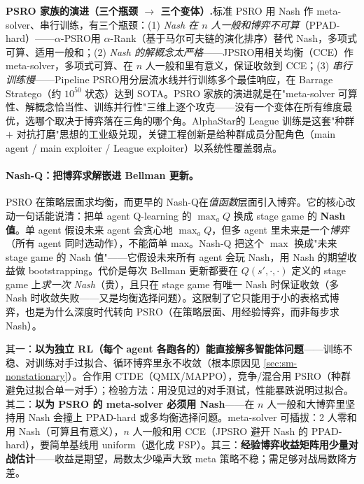 \begin{note}
\textbf{PSRO 家族的演进（三个瓶颈 $\to$ 三个变体）.}\;标准 PSRO 用 Nash 作 meta-solver、串行训练，有三个瓶颈：(1) \emph{Nash 在 $n$ 人一般和博弈不可算}（PPAD-hard）——$\alpha$-PSRO\cite{muller2020alpharank}用 $\alpha$-Rank（基于马尔可夫链的演化排序）替代 Nash，多项式可算、适用一般和；(2) \emph{Nash 的解概念太严格}——JPSRO\cite{marris2021jpsro}用相关均衡（CCE）作 meta-solver，多项式可算、在 $n$ 人一般和里有意义，保证收敛到 CCE；(3) \emph{串行训练慢}——Pipeline PSRO\cite{mcaleer2020pipeline}用分层流水线并行训练多个最佳响应，在 Barrage Stratego（约 $10^{50}$ 状态）达到 SOTA。PSRO 家族的演进就是在"meta-solver 可算性、解概念恰当性、训练并行性"三维上逐个攻克——没有一个变体在所有维度最优，选哪个取决于博弈落在三角的哪个角。AlphaStar\cite{vinyals2019alphastar}的 League 训练是这套"种群 $+$ 对抗打磨"思想的工业级兑现，关键工程创新是给种群成员分配角色（main agent / main exploiter / League exploiter）以系统性覆盖弱点。
\end{note}

\paragraph{Nash-Q：把博弈求解嵌进 Bellman 更新。}
PSRO 在策略层面求均衡，而更早的 Nash-Q\cite{hu2003nashq}在\emph{值函数}层面引入博弈。它的核心改动一句话能说清：把单 agent Q-learning 的 $\max_a Q$ 换成 stage game 的 \textbf{Nash 值}。单 agent 假设未来 agent 会贪心地 $\max_a Q$，但多 agent 里未来是一个\emph{博弈}（所有 agent 同时选动作），不能简单 max。Nash-Q 把这个 $\max$ 换成"未来 stage game 的 Nash 值"——它假设未来所有 agent 会玩 Nash，用 Nash 的期望收益做 bootstrapping。代价是每次 Bellman 更新都要在 $Q(s',\cdot,\cdot)$ 定义的 stage game 上\emph{求一次 Nash}（贵），且只在 stage game 有唯一 Nash 时保证收敛（多 Nash 时收敛失败——又是均衡选择问题）。这限制了它只能用于小的表格式博弈，也是为什么深度时代转向 PSRO（在策略层面、用经验博弈，而非每步求 Nash）。

\begin{pitfall}
其一：\textbf{以为独立 RL（每个 agent 各跑各的）能直接解多智能体问题}——训练不稳、对训练对手过拟合、循环博弈里永不收敛（根本原因见 \cref{sec:sm-nonstationary}）。合作用 CTDE（QMIX/MAPPO），竞争/混合用 PSRO（种群避免过拟合单一对手）；检验方法：用没见过的对手测试，性能暴跌说明过拟合。其二：\textbf{以为 PSRO 的 meta-solver 必须用 Nash}——在 $n$ 人一般和大博弈里坚持用 Nash 会撞上 PPAD-hard 或多均衡选择问题。meta-solver 可插拔：2 人零和用 Nash（可算且有意义），$n$ 人一般和用 CCE（JPSRO 避开 Nash 的 PPAD-hard），要简单基线用 uniform（退化成 FSP）。其三：\textbf{经验博弈收益矩阵用少量对战估计}——收益是期望，局数太少噪声大致 meta 策略不稳；需足够对战局数降方差。
\end{pitfall}

